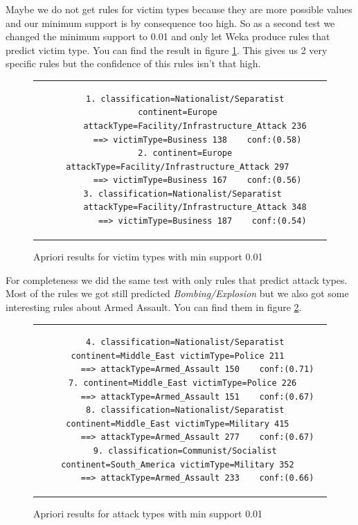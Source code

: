 \documentclass[a4]{article}
\begin{document}
Maybe we do not get rules for victim types because they are more possible values and our minimum support is by consequence too high. So as a second test we changed the minimum support to 0.01 and only let Weka produce rules that predict victim type. You can find the result in figure \ref{fig:apriori_21}. This gives us 2 very specific rules but the confidence of this rules isn't that high.
\begin{figure}[!h]
\begin{tabular}{c}
\begin{lstlisting}
  1. classification=Nationalist/Separatist continent=Europe 
      attackType=Facility/Infrastructure_Attack 236
       ==> victimType=Business 138    conf:(0.58)
  2. continent=Europe attackType=Facility/Infrastructure_Attack 297 
       ==> victimType=Business 167    conf:(0.56)
  3. classification=Nationalist/Separatist 
       attackType=Facility/Infrastructure_Attack 348 
         ==> victimType=Business 187    conf:(0.54)
\end{lstlisting}
\end{tabular}
\caption{Apriori results for victim types with min support 0.01}
\label{fig:apriori_21}
\end{figure}
For completeness we did the same test with only rules that predict attack types. Most of the rules we got still predicted \textit{Bombing/Explosion} but we also got some interesting rules about Armed Assault. You can find them in figure \ref{fig:apriori_22}.
\begin{figure}[!h]
\begin{tabular}{c}
\begin{lstlisting}
  4. classification=Nationalist/Separatist continent=Middle_East victimType=Police 211 
       ==> attackType=Armed_Assault 150    conf:(0.71)
  7. continent=Middle_East victimType=Police 226 
       ==> attackType=Armed_Assault 151    conf:(0.67)
  8. classification=Nationalist/Separatist continent=Middle_East victimType=Military 415 
       ==> attackType=Armed_Assault 277    conf:(0.67)
  9. classification=Communist/Socialist continent=South_America victimType=Military 352 
       ==> attackType=Armed_Assault 233    conf:(0.66)
\end{lstlisting}
\end{tabular}
\caption{Apriori results for attack types with min support 0.01}
\label{fig:apriori_22}
\end{figure}
\end{document}
